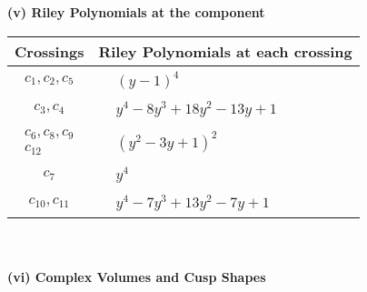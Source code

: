\documentclass[1p]{elsarticle_modified}
\theoremstyle{definition}
\begin{document}
\newpage\renewcommand{\arraystretch}{1}
\flushleft \textbf{(v) Riley Polynomials at the component}\newline \\
\begin{tabular}{m{50pt}|m{274pt}}
Crossings & \hspace{64pt}Riley Polynomials at each crossing \\
\hline $$\begin{aligned}c_{1},c_{2},c_{5}\end{aligned}$$&$\begin{aligned}
&(y-1)^4
\end{aligned}$\\
\hline $$\begin{aligned}c_{3},c_{4}\end{aligned}$$&$\begin{aligned}
&y^4-8 y^3+18 y^2-13 y+1
\end{aligned}$\\
\hline $$\begin{aligned}c_{6},c_{8},c_{9}\\c_{12}\end{aligned}$$&$\begin{aligned}
&(y^2-3 y+1)^2
\end{aligned}$\\
\hline $$\begin{aligned}c_{7}\end{aligned}$$&$\begin{aligned}
&y^4
\end{aligned}$\\
\hline $$\begin{aligned}c_{10},c_{11}\end{aligned}$$&$\begin{aligned}
&y^4-7 y^3+13 y^2-7 y+1
\end{aligned}$\\
\hline
\end{tabular}\\~\\
\newpage\flushleft \textbf{(vi) Complex Volumes and Cusp Shapes}
\end{document}

